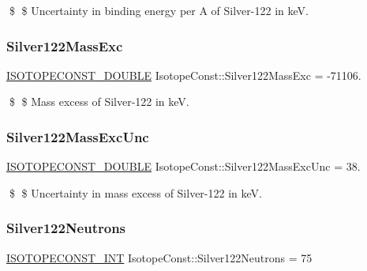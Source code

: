 \$ \$ Uncertainty in binding energy per A of Silver-\/122 in keV. \mbox{\label{group___isotope_const-_silver-_ag122_gabaa33942f00f9397dd87b267b3da470c}} 
\subsubsection{\texorpdfstring{Silver122\+Mass\+Exc}{Silver122MassExc}}
{\footnotesize\ttfamily \mbox{\hyperlink{group___isotope_const-_macros_ga8f45a7272ce02c0b4c65c44636ed719a}{I\+S\+O\+T\+O\+P\+E\+C\+O\+N\+S\+T\+\_\+\+D\+O\+U\+B\+LE}} Isotope\+Const\+::\+Silver122\+Mass\+Exc = -\/71106.}

\$ \$ Mass excess of Silver-\/122 in keV. \mbox{\label{group___isotope_const-_silver-_ag122_ga334f8024497c640ccedcba6c7af735bb}} 
\subsubsection{\texorpdfstring{Silver122\+Mass\+Exc\+Unc}{Silver122MassExcUnc}}
{\footnotesize\ttfamily \mbox{\hyperlink{group___isotope_const-_macros_ga8f45a7272ce02c0b4c65c44636ed719a}{I\+S\+O\+T\+O\+P\+E\+C\+O\+N\+S\+T\+\_\+\+D\+O\+U\+B\+LE}} Isotope\+Const\+::\+Silver122\+Mass\+Exc\+Unc = 38.}

\$ \$ Uncertainty in mass excess of Silver-\/122 in keV. \mbox{\label{group___isotope_const-_silver-_ag122_ga1c31845182fc6b5fbe7da2a2519e2bfa}} 
\subsubsection{\texorpdfstring{Silver122\+Neutrons}{Silver122Neutrons}}
{\footnotesize\ttfamily \mbox{\hyperlink{group___isotope_const-_macros_ga5f18360b3e99483a35c32d789e62621c}{I\+S\+O\+T\+O\+P\+E\+C\+O\+N\+S\+T\+\_\+\+I\+NT}} Isotope\+Const\+::\+Silver122\+Neutrons = 75}

